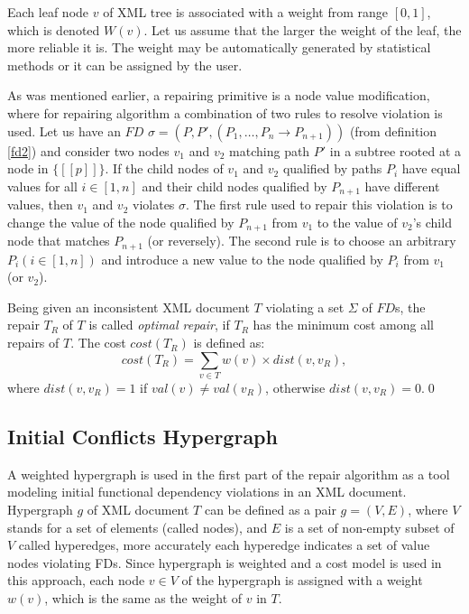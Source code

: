 Each leaf node $v$ of XML tree is associated with a weight from range $[0,1]$, which is denoted $W(v)$. Let us assume that the larger the weight of the leaf, the more reliable it is. The weight may be automatically generated by statistical methods or it can be assigned by the user.

As was mentioned earlier, a repairing primitive is a node value modification, where for repairing algorithm a combination of two rules to resolve violation is used. Let us have an $FD$ $\sigma = (P, P', (P_1, \dots, P_n \rightarrow P_{n+1}))$ (from definition \ref{fd2}) and consider two nodes $v_1$ and $v_2$ matching path $P'$ in a subtree rooted at a node in $\{[\![p]\!]\}$. If the child nodes of $v_1$ and $v_2$ qualified by paths $P_i$ have equal values for all $i \in [1,n]$ and their child nodes qualified by $P_{n+1}$ have different values, then $v_1$ and $v_2$ violates $\sigma$. The first rule used to repair this violation is to change the value of the node qualified by $P_{n+1}$ from $v_1$ to the value of $v_2$'s child node that matches $P_{n+1}$ (or reversely). The second rule is to choose an arbitrary $P_i (i \in [1,n])$ and introduce a new value to the node qualified by $P_i$ from $v_1$ (or $v_2$).

\begin{define}
Being given an inconsistent XML document $T$ violating a set $\Sigma$ of $FD$s, the repair $T_R$ of $T$ is called {\sl optimal repair}, if $T_R$ has the minimum cost among all repairs of $T$. The cost $cost(T_R)$ is defined as:
\begin{displaymath}
cost(T_R) = \sum_{v \in T} w(v) \times dist(v, v_R),
\end{displaymath}
where $dist(v, v_R)=1$ if $val(v) \neq val(v_R)$, otherwise $dist(v, v_R)=0$.\qed
\end{define}

\subsection{Initial Conflicts Hypergraph}

A weighted hypergraph is used in the first part of the repair algorithm as a tool modeling initial functional dependency violations in an XML document. Hypergraph $g$ of XML document $T$ can be defined as a pair $g = (V,E)$, where $V$ stands for a set of elements (called nodes), and $E$ is a set of non-empty subset of $V$ called hyperedges, more accurately each hyperedge indicates a set of value nodes violating FDs. Since hypergraph is weighted and a cost model is used in this approach, each node $v \in V$ of the hypergraph is assigned with a weight $w(v)$, which is the same as the weight of $v$ in $T$.\\

